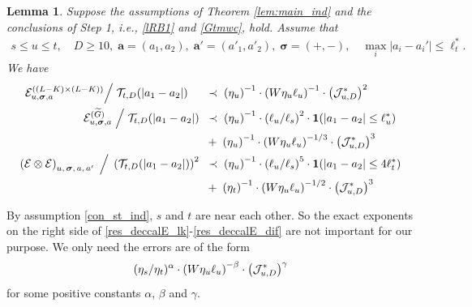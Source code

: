 \documentclass[10pt,reqno]{article}
\theoremstyle{plain} %
\newtheorem{lemma}[theorem]{Lemma}
\theoremstyle{remark}
\numberwithin{equation}{section}
\begin{document}
\begin{lemma}\label{lem_dec_calE}  Suppose  the assumptions of Theorem  \ref{lem:main_ind} and the conclusions  of Step 1, i.e., \eqref{lRB1} and \eqref{Gtmwc}, 
hold. Assume that 
\begin{align} 
s\le u\le t, \quad  D\ge 10, \; \textbf{a}=(a_1,a_2),\; \textbf{a}'=(a'_1,a'_2),\; \boldsymbol{\sigma}=(+,-), \quad 
\max_i |a_i-a_i'|\le \ell_t ^*. \label{57}
\end{align}
 We  have 
\begin{align}\label{res_deccalE_lk}
       {\cal E}^{( (L-K)\times(L-K) )}
       _{u, \boldsymbol{\sigma},\textbf{a}} \Big/\; 
  {\cal T}_{t,D}(|a_1-a_2|) \quad 
 \;  &\; \prec \; 
   \left(\eta_u\right)^{-1} 
   \cdot  
   \left(W\eta_u\ell_u\right)^{-1}
    \cdot 
 \left({\cal J}^{*}_{u,D} \right)^{2}
 \\
      \mathcal{E}^{( \widetilde{G} )}_{u, \boldsymbol{\sigma},\textbf{a}} 
    \;\Big/\; 
 {\cal T}_{t,D}(|a_1-a_2|)
 \;  &\; \prec \; 
 \left(\eta_u\right)^{-1} 
  \cdot \left(\ell_u/\ell_s\right)^2\cdot{\bf 1}(|a_1-a_2|\le \ell_u^*)
    \nonumber  \\
       \;  &\; + \;  \left(\eta_u\right)^{-1} 
  \cdot
       \left(W \eta_u \ell_u\right)^{-1/3}  \cdot 
       \left({\cal J}^{*}_{u,D} \right)^{3}
 \label{res_deccalE_wG}\\
\label{res_deccalE_dif}
    \left(
   \mathcal{E}\otimes  \mathcal{E} \right)
   _{u, \,\boldsymbol{\sigma},  \,{\textbf a} ,\, {\textbf a}'
     }
     \;\Big/\; 
 \left( {\cal T}_{t,D}(|a_1-a_2|)\right)^2
 \;  &\; \prec \; 
  \left(\eta_u\right)^{-1} 
  \cdot \left(\ell_u/\ell_s\right)^5\cdot{\bf 1}(|a_1-a_2|\le 4\ell_t^*)
     \nonumber \\
       \;  &\; + \;  \left(\eta_t\right)^{-1} 
  \cdot
       \left(W \eta_u \ell_u\right)^{-1/2}  \cdot 
    \left({\cal J}^{*}_{u,D} \right)^{3}
\end{align} 
  \end{lemma}
By assumption  \eqref{con_st_ind},  $s$ and $t$ are near each other.  So the exact exponents  on the right side  of \eqref{res_deccalE_lk}-\eqref{res_deccalE_dif} are not important for our purpose.  We only  need the errors are of the form 
$$
  (\eta_s/\eta_t)^\alpha\cdot \left(W \eta_u \ell_u\right)^{-\beta}\cdot \left({\cal J}^{*}_{u,D} \right) ^{\gamma}
  $$
for some positive constants $\alpha$, $\beta$ and $\gamma$. 
\end{document}

